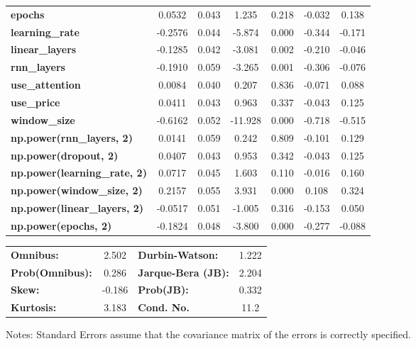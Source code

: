 \begin{center}
\begin{tabular}{lcccccc}
\textbf{epochs}                            &       0.0532  &        0.043     &     1.235  &         0.218        &       -0.032    &        0.138     \\
\textbf{learning\_rate}                    &      -0.2576  &        0.044     &    -5.874  &         0.000        &       -0.344    &       -0.171     \\
\textbf{linear\_layers}                    &      -0.1285  &        0.042     &    -3.081  &         0.002        &       -0.210    &       -0.046     \\
\textbf{rnn\_layers}                       &      -0.1910  &        0.059     &    -3.265  &         0.001        &       -0.306    &       -0.076     \\
\textbf{use\_attention}                    &       0.0084  &        0.040     &     0.207  &         0.836        &       -0.071    &        0.088     \\
\textbf{use\_price}                        &       0.0411  &        0.043     &     0.963  &         0.337        &       -0.043    &        0.125     \\
\textbf{window\_size}                      &      -0.6162  &        0.052     &   -11.928  &         0.000        &       -0.718    &       -0.515     \\
\textbf{np.power(rnn\_layers, 2)}          &       0.0141  &        0.059     &     0.242  &         0.809        &       -0.101    &        0.129     \\
\textbf{np.power(dropout, 2)}              &       0.0407  &        0.043     &     0.953  &         0.342        &       -0.043    &        0.125     \\
\textbf{np.power(learning\_rate, 2)}       &       0.0717  &        0.045     &     1.603  &         0.110        &       -0.016    &        0.160     \\
\textbf{np.power(window\_size, 2)}         &       0.2157  &        0.055     &     3.931  &         0.000        &        0.108    &        0.324     \\
\textbf{np.power(linear\_layers, 2)}       &      -0.0517  &        0.051     &    -1.005  &         0.316        &       -0.153    &        0.050     \\
\textbf{np.power(epochs, 2)}               &      -0.1824  &        0.048     &    -3.800  &         0.000        &       -0.277    &       -0.088     \\
\bottomrule
\end{tabular}
\begin{tabular}{lclc}
\textbf{Omnibus:}       &  2.502 & \textbf{  Durbin-Watson:     } &    1.222  \\
\textbf{Prob(Omnibus):} &  0.286 & \textbf{  Jarque-Bera (JB):  } &    2.204  \\
\textbf{Skew:}          & -0.186 & \textbf{  Prob(JB):          } &    0.332  \\
\textbf{Kurtosis:}      &  3.183 & \textbf{  Cond. No.          } &     11.2  \\
\bottomrule
\end{tabular}
\end{center}

Notes: \newline
 [1] Standard Errors assume that the covariance matrix of the errors is correctly specified.